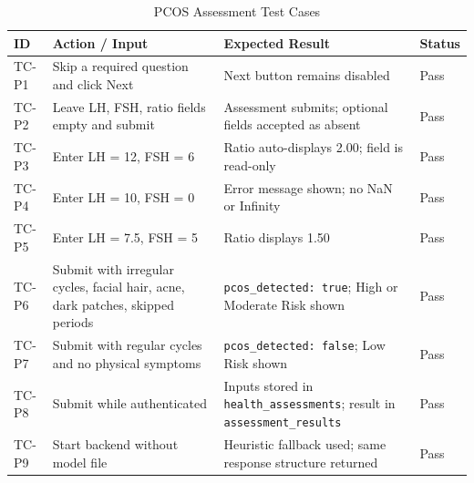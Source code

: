 \begin{table}[h!]
\centering
\caption{PCOS Assessment Test Cases}
\label{tab:tc-pcos}
\renewcommand{\arraystretch}{1.3}
\setlength{\tabcolsep}{5pt}
\begin{tabular}{|p{1cm}|p{4.5cm}|p{5cm}|p{1.5cm}|}
\hline
\rowcolor[HTML]{D9D9D9}
\textbf{ID} & \textbf{Action / Input} & \textbf{Expected Result} & \textbf{Status} \\
\hline
TC-P1 & Skip a required question and click Next & Next button remains disabled & Pass \\
\hline
TC-P2 & Leave LH, FSH, ratio fields empty and submit & Assessment submits; optional fields accepted as absent & Pass \\
\hline
TC-P3 & Enter LH = 12, FSH = 6 & Ratio auto-displays 2.00; field is read-only & Pass \\
\hline
TC-P4 & Enter LH = 10, FSH = 0 & Error message shown; no NaN or Infinity & Pass \\
\hline
TC-P5 & Enter LH = 7.5, FSH = 5 & Ratio displays 1.50 & Pass \\
\hline
TC-P6 & Submit with irregular cycles, facial hair, acne, dark patches, skipped periods & \texttt{pcos\_detected: true}; High or Moderate Risk shown & Pass \\
\hline
TC-P7 & Submit with regular cycles and no physical symptoms & \texttt{pcos\_detected: false}; Low Risk shown & Pass \\
\hline
TC-P8 & Submit while authenticated & Inputs stored in \texttt{health\_assessments}; result in \texttt{assessment\_results} & Pass \\
\hline
TC-P9 & Start backend without model file & Heuristic fallback used; same response structure returned & Pass \\
\hline
\end{tabular}
\end{table}


